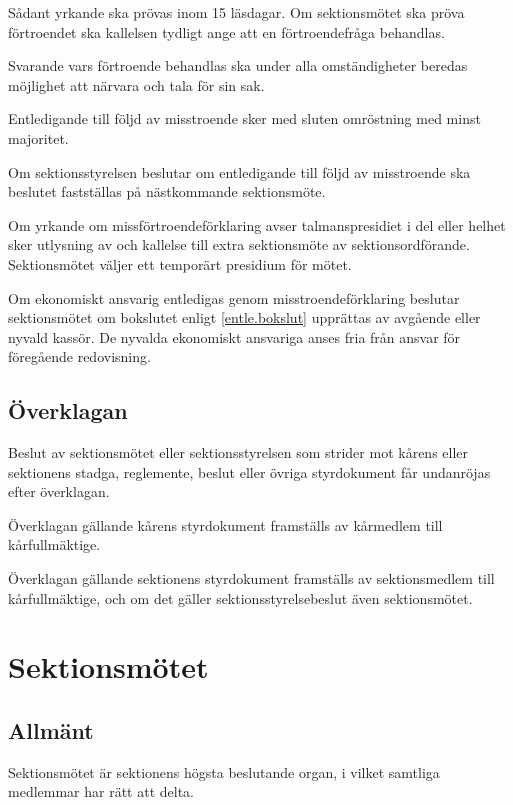 \documentclass{styrdokument}
\begin{document}
\? Sådant yrkande ska prövas inom 15 läsdagar.
Om sektionsmötet ska pröva förtroendet ska kallelsen tydligt ange att en förtroendefråga behandlas.
\label{beslut.misstroende.kallelse}

\? Svarande vars förtroende behandlas ska under alla omständigheter beredas möjlighet att närvara och tala för sin sak.

\? Entledigande till följd av misstroende sker med sluten omröstning med minst  majoritet.
\label{beslut.misstroende.majoritet}

\? Om sektionsstyrelsen beslutar om entledigande till följd av misstroende ska beslutet fastställas på
nästkommande sektionsmöte.

\? Om yrkande om missförtroendeförklaring avser talmanspresidiet i del eller helhet sker utlysning av och kallelse till extra sektionsmöte av sektionsordförande.
Sektionsmötet väljer ett temporärt presidium för mötet.

\? Om ekonomiskt ansvarig entledigas genom misstroendeförklaring beslutar sektionsmötet om bokslutet enligt \cref{entle.bokslut} upprättas av avgående eller nyvald kassör.
De nyvalda ekonomiskt ansvariga anses fria från ansvar för föregående redovisning.

\subsection{Överklagan}

\? Beslut av sektionsmötet eller sektionsstyrelsen som strider mot kårens eller sektionens stadga, reglemente, beslut eller övriga styrdokument får undanröjas efter överklagan.

\? Överklagan gällande kårens styrdokument framställs av kårmedlem till kårfullmäktige.

\? Överklagan gällande sektionens styrdokument framställs av sektionsmedlem till kårfullmäktige, och om det gäller sektionsstyrelsebeslut även sektionsmötet.

\section{Sektionsmötet}
\subsection{Allmänt}

\? Sektionsmötet är sektionens högsta beslutande organ, i vilket samtliga medlemmar har rätt att delta.
\end{document}
